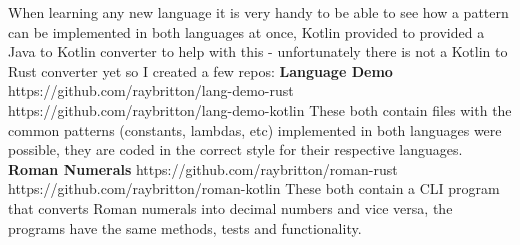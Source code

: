 \documentclass[a4paper,11pt]{article}
\begin{document}
When learning any new language it is very handy to be able to see how a pattern can be implemented in both languages at once, Kotlin provided to provided a Java to Kotlin converter to help with this - unfortunately there is not a Kotlin to Rust converter yet so I created a few repos:
\medskip
\textbf{Language Demo}
\newline
https://github.com/raybritton/lang-demo-rust
\newline
https://github.com/raybritton/lang-demo-kotlin
\newline
These both contain files with the common patterns (constants, lambdas, etc) implemented in both languages were possible, they are coded in the correct style for their respective languages. 
\newline
\newline
\textbf{Roman Numerals}
\newline
https://github.com/raybritton/roman-rust
\newline
https://github.com/raybritton/roman-kotlin
\newline
These both contain a CLI program that converts Roman numerals into decimal numbers and vice versa, the programs have the same methods, tests and functionality.\newline
\end{document}

